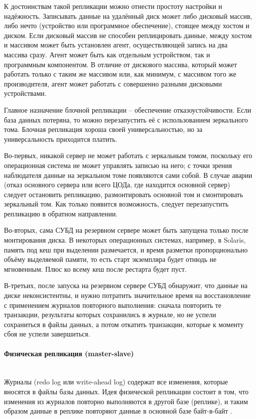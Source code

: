 К достоинствам такой репликации можно отнести простоту настройки и надёжность. Записывать данные на удалённый диск может
либо дисковый массив, либо нечто (устройство или программное обеспечение), стоящее между хостом и диском. Если дисковый
массив не способен реплицировать данные, между хостом и массивом может быть установлен агент, осуществляющей запись на
два массива сразу. Агент может быть как отдельным устройством, так и программным компонентом. В отличие от дискового
массива, который может работать только с таким же массивом или, как минимум, с массивом того же производителя, агент
может работать с совершенно разными дисковыми устройствами.

Главное назначение блочной репликации – обеспечение отказоустойчивости. Если база данных потеряна, то можно
перезапустить её с использованием зеркального тома. Блочная репликация хороша своей универсальностью, но за
универсальность приходится платить.

Во-первых, никакой сервер не может работать с зеркальным томом, поскольку его операционная система не может управлять
записью на него; с точки зрения наблюдателя данные на зеркальном томе появляются сами собой. В случае аварии (отказ
основного сервера или всего ЦОДа, где находится основной сервер) следует остановить репликацию, размонтировать основной
том и смонтировать зеркальный том. Как только появится возможность, следует перезапустить репликацию в обратном
направлении.

Во-вторых, сама СУБД на резервном сервере может быть запущена только после монтирования диска. В некоторых операционных
системах, например, в Solaris, память под кеш при выделении размечается, и время разметки пропорционально объёму
выделяемой памяти, то есть старт экземпляра будет отнюдь не мгновенным. Плюс ко всему кеш после рестарта будет пуст.

В-третьих, после запуска на резервном сервере СУБД обнаружит, что данные на диске неконсистентны, и нужно потратить
значительное время на восстановление с применением журналов повторного выполнения: сначала повторить те транзакции,
результаты которых сохранились в журнале, но не успели сохраниться в файлы данных, а потом откатить транзакции, которые
к моменту сбоя не успели завершиться. \autocite{Replication}

\paragraph{Физическая репликация (master-slave)} ~\\
Журналы (redo log или write-ahead log) содержат все изменения, которые вносятся в файлы базы данных. Идея физической
репликации состоит в том, что изменения из журналов повторно выполняются в другой базе (реплике), и таким образом данные
в реплике повторяют данные в основной базе байт-в-байт \autocite{PhysLogPeplic}.


